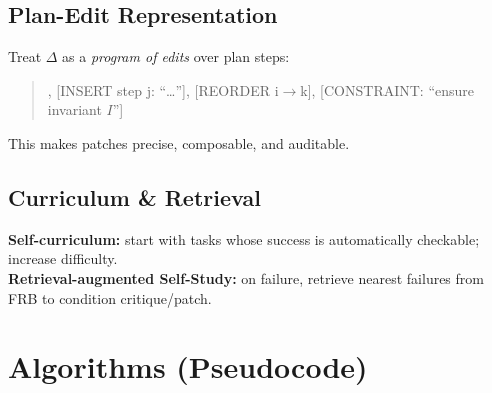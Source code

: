 \documentclass[11pt]{article}
\begin{document}
\subsection{Plan-Edit Representation}
Treat $\Delta$ as a \emph{program of edits} over plan steps:
\begin{quote}, [INSERT step j: ``\dots''], [REORDER i$\to$k], [CONSTRAINT: ``ensure invariant $I$'']
\end{quote}
This makes patches precise, composable, and auditable.

\subsection{Curriculum \& Retrieval}
\textbf{Self-curriculum:} start with tasks whose success is automatically checkable; increase difficulty. \\
\textbf{Retrieval-augmented Self-Study:} on failure, retrieve nearest failures from FRB to condition critique/patch.

\section{Algorithms (Pseudocode)}
\end{document}
